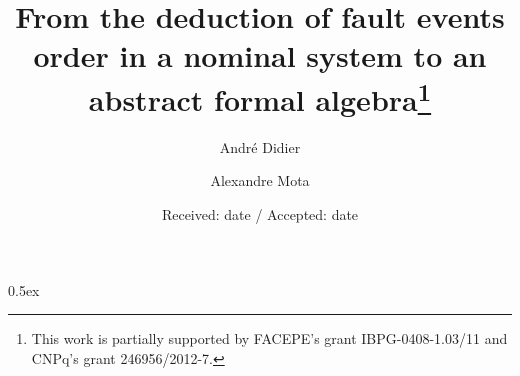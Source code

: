 \documentclass{article}
\begin{document}
\title{From the deduction of fault events order in a nominal system to an abstract formal algebra\thanks{This work is partially supported by FACEPE's grant IBPG-0408-1.03/11 and CNPq's grant 246956/2012-7.}}

\author{André Didier \and Alexandre Mota}

\date{Received: date / Accepted: date}


%
\parindent 0pt\parskip 0.5ex



%



%
%
\end{document}
